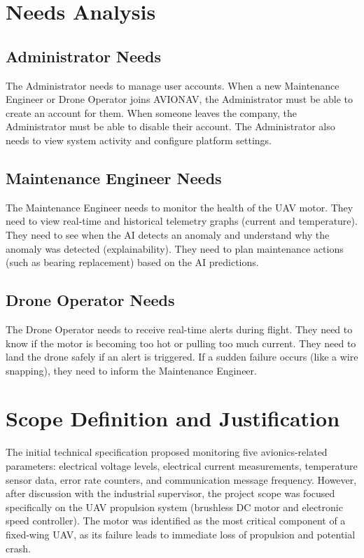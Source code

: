 \section{Needs Analysis}

\subsection{Administrator Needs}

The Administrator needs to manage user accounts. When a new Maintenance Engineer or Drone Operator joins AVIONAV, the Administrator must be able to create an account for them. When someone leaves the company, the Administrator must be able to disable their account. The Administrator also needs to view system activity and configure platform settings.

\subsection{Maintenance Engineer Needs}

The Maintenance Engineer needs to monitor the health of the UAV motor. They need to view real-time and historical telemetry graphs (current and temperature). They need to see when the AI detects an anomaly and understand why the anomaly was detected (explainability). They need to plan maintenance actions (such as bearing replacement) based on the AI predictions.

\subsection{Drone Operator Needs}

The Drone Operator needs to receive real-time alerts during flight. They need to know if the motor is becoming too hot or pulling too much current. They need to land the drone safely if an alert is triggered. If a sudden failure occurs (like a wire snapping), they need to inform the Maintenance Engineer.

\section{Scope Definition and Justification}

The initial technical specification proposed monitoring five avionics-related parameters: electrical voltage levels, electrical current measurements, temperature sensor data, error rate counters, and communication message frequency. However, after discussion with the industrial supervisor, the project scope was focused specifically on the UAV propulsion system (brushless DC motor and electronic speed controller). The motor was identified as the most critical component of a fixed-wing UAV, as its failure leads to immediate loss of propulsion and potential crash.

